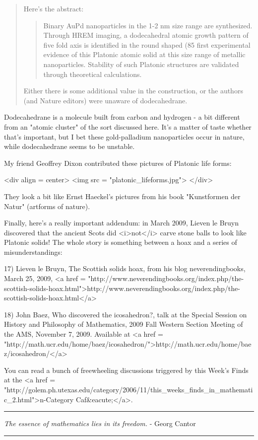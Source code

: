 \begin{quote}
Here's the abstract: 

\begin{quote}
Binary AuPd nanoparticles in the 1-2 nm size range are synthesized. Through
HREM imaging, a dodecahedral atomic growth pattern of five fold axis is
identified in the round shaped (85%
first experimental evidence of this Platonic atomic solid at this size range
of metallic nanoparticles. Stability of such Platonic structures are
validated through theoretical calculations.
\end{quote}

Either there is some additional value in the construction, or the authors
(and Nature editors) were unaware of dodecahedrane.
\end{quote}

Dodecahedrane is a molecule built from carbon and hydrogen - a bit
different from an "atomic cluster" of the sort discussed
here.  It's a matter of taste whether that's important, but I bet
these gold-palladium nanoparticles occur in nature, while dodecahedrane
seems to be unstable.

My friend Geoffrey Dixon contributed these pictures of Platonic
life forms:

<div align = center>
<img src = "platonic_lifeforms.jpg">
</div>

They look a bit like Ernst Haeckel's pictures from his book
"Kunstformen der Natur" (artforms of nature).

Finally, here's a really important addendum: in March 2009, Lieven le
Bruyn discovered that the ancient Scots did <i>not</i> carve stone
balls to look like Platonic solids!  The whole story is something
between a hoax and a series of misunderstandings:

17) Lieven le Bruyn, The Scottish solids hoax, from his blog
neverendingbooks, March 25, 2009,
<a href = "http://www.neverendingbooks.org/index.php/the-scottish-solids-hoax.html">http://www.neverendingbooks.org/index.php/the-scottish-solids-hoax.html</a>

18) John Baez, Who discovered the icosahedron?, talk at the Special
Session on History and Philosophy of Mathematics, 2009 Fall Western
Section Meeting of the AMS, November 7, 2009.  Available at
<a href = "http://math.ucr.edu/home/baez/icosahedron/">http://math.ucr.edu/home/baez/icosahedron/</a>

You can read a bunch of freewheeling discussions triggered by
this Week's Finds at the <a href = "http://golem.ph.utexas.edu/category/2006/11/this_weeks_finds_in_mathematic_2.html">n-Category Caf&eacute;</a>.

\par\noindent\rule{\textwidth}{0.4pt}
\emph{The essence of mathematics lies in its freedom.} - Georg Cantor

\par\noindent\rule{\textwidth}{0.4pt}

